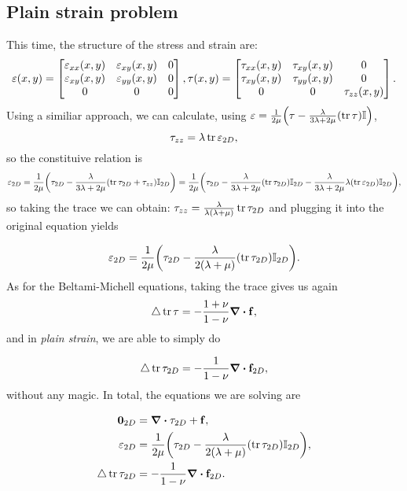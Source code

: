\documentclass[reqno, a4paper]{article}
\begin{document}
\subsection{Plain strain problem}
\label{sec:plain_strain_problem}
This time, the structure of the stress and strain are:
\[
	\mathbb{\varepsilon}\qty(x,y)=\begin{bmatrix}
		\varepsilon_{xx}\qty(x,y) & \varepsilon_{xy}\qty(x,y) & 0 \\
		\varepsilon_{xy}\qty(x,y) & \varepsilon_{yy}\qty(x,y) & 0 \\
		0 & 0 & 0
	\end{bmatrix}, 	
	\mathbb{\tau}\qty(x,y)=\begin{bmatrix}
		\tau_{xx}\qty(x,y) & \tau_{xy}\qty(x,y) & 0 \\
		\tau_{xy}\qty(x,y) & \tau_{yy}\qty(x,y) & 0 \\
		0 & 0 & \tau_{zz}\qty(x,y)
	\end{bmatrix}.
\]
Using a similiar approach, we can calculate, using $\mathbb{\varepsilon} = \frac{1}{2 \mu}\qty(\mathbb{\tau}-\frac{\lambda}{3 \lambda + 2 \mu}\qty(\tr \mathbb{\tau})\mathbb{I})$,
\[
	\tau_{zz} = \lambda \tr \mathbb{\varepsilon}_{2D},
\]
so the constituive relation is
\[
	\mathbb{\varepsilon}_{2D} = \frac{1}{2 \mu}\qty(\mathbb{\tau}_{2D}- \frac{\lambda}{3 \lambda+ 2 \mu}\qty(\tr \mathbb{\tau}_{2D}+\tau_{zz})\mathbb{I}_{2D}) = \frac{1}{2 \mu}\qty(\mathbb{\tau}_{2D}-\frac{\lambda}{3 \lambda+ 2 \mu}\qty(\tr \mathbb{\tau}_{2D})\mathbb{I}_{2D}-\frac{\lambda}{3 \lambda+ 2 \mu}\lambda \qty(\tr \mathbb{\varepsilon}_{2D})\mathbb{I}_{2D}),
\]
so taking the trace we can obtain: $\tau_{zz} = \frac{\lambda}{\lambda\qty(\lambda+\mu)} \tr \mathbb{\tau}_{2D}$ and plugging it into the original equation yields

\[
	\mathbb{\varepsilon}_{2D} = \frac{1}{2 \mu}\qty(\mathbb{\tau}_{2D}-\frac{\lambda}{2\qty(\lambda+\mu)}\qty(\tr \mathbb{\tau}_{2D})\mathbb{I}_{2D}).
\]
As for the Beltami-Michell equations, taking the trace gives us again
\[
	\laplace \tr \tensorq{\tau} = - \frac{1+\nu}{1-\nu}\divergence{\vb{f}},
\]
and in \textit{plain strain}, we are able to simply do

\[
	\laplace \tr \tensorq{\tau}_{2D} = - \frac{1}{1-\nu}\divergence{\vb{f}_{2D}},
\]
without any magic. In total, the equations we are solving are

\begin{align}
  \label{eq:plain_strain_formulation}
  \vb{0}_{2D} &= \divergence{\tensorq{\tau}_{2D}}+ \vb{f}, \\
  \tensorq{\varepsilon}_{2D} &= \frac{1}{2 \mu}\qty(\tensorq{\tau}_{2D}-\frac{\lambda}{2\qty(\lambda+\mu)}\qty(\tr \tensorq{\tau}_{2D})\identity_{2D}),\\
  \laplace \tr \tensorq{\tau}_{2D} &= - \frac{1}{1-\nu}\divergence{\vb{f}_{2D}}.
\end{align}
\end{document}
